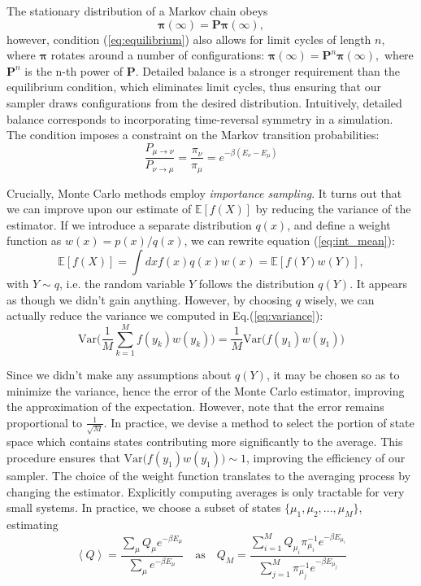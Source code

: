 The stationary distribution of a Markov chain obeys
\begin{equation}
\bm \pi ( \infty ) = \bm P \bm \pi ( \infty ) ,
\end{equation}
however, condition (\ref{eq:equilibrium}) also allows  for limit cycles of length $n$, where $\bm \pi$ rotates around a number of configurations: $
\bm \pi ( \infty ) = \bm P^n \bm \pi ( \infty ) ,
$
 where $\bm P^n$ is the n-th power of $\bm P$.
Detailed balance is a stronger requirement than the equilibrium condition, which eliminates limit cycles, thus ensuring that our sampler draws configurations from the desired distribution.
Intuitively, detailed balance corresponds to incorporating time-reversal symmetry in a simulation.
The condition imposes a constraint on the Markov transition probabilities:
\begin{equation}\label{eq:markovCondition}
\frac{P_{\mu\rightarrow\nu}}{P_{\nu\rightarrow\mu}} = \frac{\pi_\nu}{\pi_\mu} = e^{-\beta ( E_\nu - E_\mu ) }
\end{equation}

Crucially, Monte Carlo methods employ \emph{importance sampling}.
It turns out that we can improve upon our estimate of $\mathbb{E} [f(X)]$ by reducing the variance of the estimator. If we introduce a separate distribution $q(x)$, and define a weight function as $w(x) = p(x)/ q(x)$, we can rewrite equation (\ref{eq:int_mean}):
\begin{equation}
\mathbb{E} [f(X)] = \int dx f(x) q(x) w(x) = \mathbb{E} [f(Y) w(Y)],
\end{equation}
with $Y \sim q$, i.e. the random variable $Y$ follows the distribution $q(Y)$.
It appears as though we didn't gain anything. However, by choosing $q$ wisely, we can actually reduce the variance we computed in Eq.(\ref{eq:variance}):
\begin{equation}
\text{Var}\bigg( \frac{1}{M} \sum_{k=1}^M f(y_k) w(y_k) \bigg) = \frac{1}{M} \text{Var}\bigg( f(y_1) w(y_1) \bigg)
\end{equation}

Since we didn't make any assumptions about $q(Y)$, it may be chosen so as to minimize the variance, hence the error of the Monte Carlo estimator, improving the approximation of the expectation. However, note that the error remains proportional to $\frac{1}{\sqrt{M}}$.
In practice, we devise a method to select the portion of state space which contains states contributing more significantly to the average.
This procedure ensures that $\text{Var}\big( f(y_1) w(y_1) \big) \sim 1$, improving the efficiency of our sampler.
The choice of the weight function translates to the averaging process by changing the estimator.
Explicitly computing averages is only tractable for very small systems.
In practice, we choose a subset of states $\{\mu_1, \mu_2, ..., \mu_M \} $, estimating
\begin{equation}
\left\langle Q \right\rangle = \frac{ \sum_\mu Q_\mu e^{-\beta E_\mu} }{ \sum_\mu e^{-\beta E_\mu}} \quad \text{as} \quad
Q_M = \frac{ \sum_{i=1}^M Q_{\mu_i} \pi_{\mu_i}^{-1} e^{ -\beta E_{\mu_i} } }{ \sum_{j=1}^M \pi_{\mu_j}^{-1} e^{ -\beta E_{\mu_j} }  }
\end{equation}

